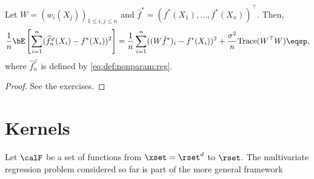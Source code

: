 \begin{shaded}
\begin{proposition}
Let  $W = (w_i(X_j))_{1\leqslant i,j \leqslant n}$ and $\bar f^* = (f^*(X_1),\ldots,f^*(X_n))^\top$. Then,
\[
\frac{1}{n}\bE\left[\sum_{i=1}^n(\widehat f^\varphi_n(X_i) - f^*(X_i))^2\right] = \frac{1}{n}\sum_{i=1}^n((W\bar f^*)_i - f^*(X_i))^2 + \frac{\sigma^2}{n}\mathrm{Trace}(W^\top W)\eqsp,
\]
where $\widehat f^\varphi_n$  is defined by \eqref{eq:def:nonparam:reg}.
\end{proposition}
\end{shaded}
\begin{proof}
See the exercises.
\end{proof}

\section{Kernels}
%
Let $\calF$ be a set of functions from $\xset=\rset^d$ to $\rset$. The multivariate regression problem considered so far is part of the more general framework
